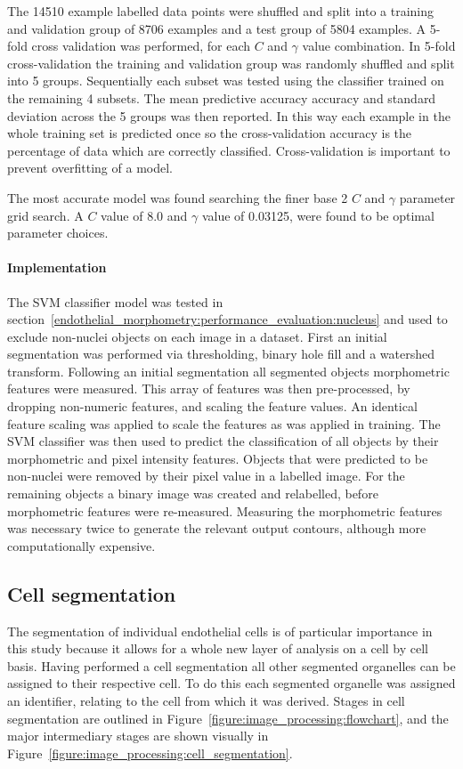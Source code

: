 The 14510 example labelled data points were shuffled and split into a training and validation group of 8706 examples and a test group of 5804 examples. A 5-fold cross validation was performed, for each $C$ and $\gamma$ value combination. In 5-fold cross-validation the training and validation group was randomly shuffled and split into 5 groups. Sequentially each subset was tested using the classifier trained on the remaining 4 subsets. The mean predictive accuracy accuracy and standard deviation across the 5 groups was then reported. In this way each example in the whole training set is predicted once so the cross-validation accuracy is the percentage of data which are correctly classified. Cross-validation is important to prevent overfitting of a model.

The most accurate model was found searching the finer base 2 $C$ and $\gamma$ parameter grid search. A $C$ value of 8.0 and $\gamma$ value of 0.03125, were found to be optimal parameter choices.
\paragraph{Implementation}
The SVM classifier model was tested in section~\ref{endothelial_morphometry:performance_evaluation:nucleus} and used to exclude non-nuclei objects on each image in a dataset. First an initial segmentation was performed via thresholding, binary hole fill and a watershed transform. Following an initial segmentation all segmented objects morphometric features were measured. This array of features was then pre-processed, by dropping non-numeric features, and scaling the feature values. An identical feature scaling was applied to scale the features as was applied in training. The SVM classifier was then used to predict the classification of all objects by their morphometric and pixel intensity features. Objects that were predicted to be non-nuclei were removed by their pixel value in a labelled image. For the remaining objects a binary image was created and relabelled, before morphometric features were re-measured. Measuring the morphometric features was necessary twice to generate the relevant output contours, although more computationally expensive.

\subsection{Cell segmentation}
\label{endothelial_morphometry:image_processing:cell}
The segmentation of individual endothelial cells is of particular importance in this study because it allows for a whole new layer of analysis on a cell by cell basis. Having performed a cell segmentation all other segmented organelles can be assigned to their respective cell. To do this each segmented organelle was assigned an identifier, relating to the cell from which it was derived. Stages in cell segmentation are outlined in Figure~\ref{figure:image_processing:flowchart}, and the major intermediary stages are shown visually in Figure~\ref{figure:image_processing:cell_segmentation}.

